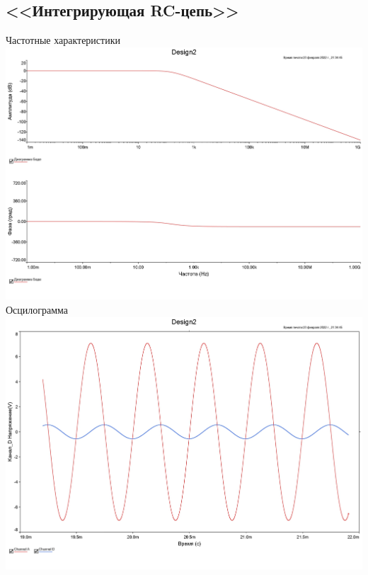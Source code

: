 \documentclass[11pt]{article}
\begin{document}
\subsection{<<Интегрирующая RC-цепь>>}
\begin{center}
    Частотные характеристики
    \includegraphics[width=1\linewidth]{2/gra1.jpg}
    Осцилограмма
    \includegraphics[width=1\linewidth]{2/gra2.jpg}
\end{center}
\end{document}
